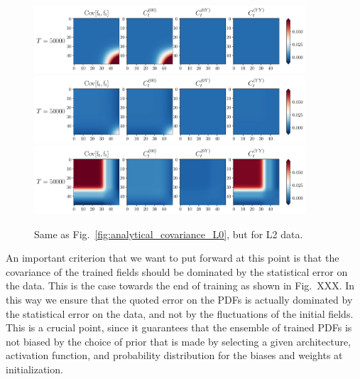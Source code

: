 \begin{figure}[ht!]
  \centering
  \includegraphics[width=0.90\textwidth]{plots/analytical_solution/covariance/covariance_ft_0_L2.pdf}
  \includegraphics[width=0.90\textwidth]{plots/analytical_solution/covariance/covariance_ft_1_L2.pdf}
  \includegraphics[width=0.90\textwidth]{plots/analytical_solution/covariance/covariance_ft_100_L2.pdf}
  \caption{Same as Fig.~\ref{fig:analytical_covariance_L0}, but for L2 data.}
  \label{fig:analytical_covariance_L2}
\end{figure}


An important criterion that we want to put forward at this point is that the covariance of the trained
fields should be dominated by the statistical error on the data. This is the case towards the end of
training as shown in Fig.~XXX. In this way we ensure that the quoted error 
on the PDFs is actually dominated by the statistical error on the data, and not by the fluctuations of the
initial fields. This is a crucial point, since it guarantees that the ensemble of trained PDFs is not biased by the
choice of prior that is made by selecting a given architecture, activation function, and probability distribution 
for the biases and weights at initialization. 

\FloatBarrier
